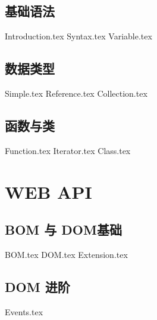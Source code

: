 \documentclass{PionpillNote-book}
\begin{document}
\chapter{基础语法}
{Introduction.tex}
{Syntax.tex}
{Variable.tex}
\chapter{数据类型}
{Simple.tex}
{Reference.tex}
{Collection.tex}
\chapter{函数与类}
{Function.tex}
{Iterator.tex}
{Class.tex}
\part{WEB API}
\chapter{BOM 与 DOM基础}
{BOM.tex}
{DOM.tex}
{Extension.tex}
\chapter{DOM 进阶}
{Events.tex}
\end{document}
